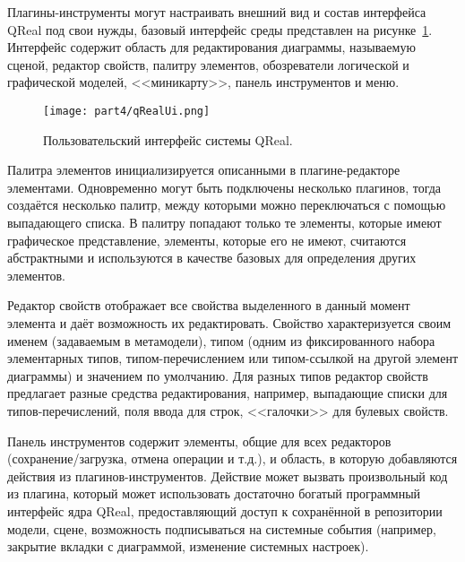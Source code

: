 Плагины-инструменты могут настраивать внешний вид и состав интерфейса QReal под свои 
нужды, базовый интерфейс среды представлен на рисунке~\ref{qRealUi}. Интерфейс содержит 
область для редактирования диаграммы, называемую сценой, редактор свойств, палитру 
элементов, обозреватели логической и графической моделей, <<миникарту>>, панель инструментов и меню.

\begin{figure} [ht]
	\begin{center}
		\texttt{[image: part4/qRealUi.png]}
		\caption{Пользовательский интерфейс системы QReal.}
		\label{qRealUi}
	\end{center}
\end{figure}

Палитра элементов инициализируется описанными в плагине-редакторе элементами. Одновременно 
могут быть подключены несколько плагинов, тогда создаётся  несколько палитр, между 
которыми можно переключаться с помощью выпадающего списка. В палитру попадают только 
те элементы, которые имеют графическое представление, элементы, которые его не имеют, 
считаются абстрактными и используются в качестве базовых для определения других элементов.

Редактор свойств отображает все свойства выделенного в данный момент элемента и даёт 
возможность их редактировать. Свойство характеризуется своим именем (задаваемым в метамодели), 
типом (одним из фиксированного набора элементарных типов, типом-перечислением или 
типом-ссылкой на другой элемент диаграммы) и значением по умолчанию. Для разных типов 
редактор свойств предлагает разные средства редактирования, например, выпадающие списки 
для типов-перечислений, поля ввода для строк, <<галочки>> для булевых свойств.

Панель инструментов содержит элементы, общие для всех редакторов (сохранение/загрузка, 
отмена операции и т.д.), и область, в которую добавляются действия из плагинов-инструментов. 
Действие может вызвать произвольный код из плагина, который может использовать достаточно 
богатый программный интерфейс ядра QReal, предоставляющий доступ к сохранённой в репозитории 
модели, сцене, возможность подписываться на системные события (например, закрытие вкладки 
с диаграммой, изменение системных настроек).

